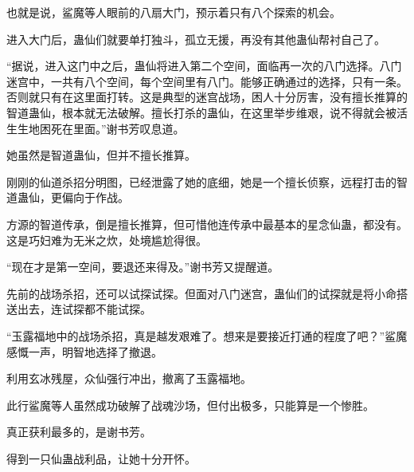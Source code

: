\begin{this_body}
也就是说，鲨魔等人眼前的八扇大门，预示着只有八个探索的机会。

进入大门后，蛊仙们就要单打独斗，孤立无援，再没有其他蛊仙帮衬自己了。

“据说，进入这门中之后，蛊仙将进入第二个空间，面临再一次的八门选择。八门迷宫中，一共有八个空间，每个空间里有八门。能够正确通过的选择，只有一条。否则就只有在这里面打转。这是典型的迷宫战场，困人十分厉害，没有擅长推算的智道蛊仙，根本就无法破解。擅长打杀的蛊仙，在这里举步维艰，说不得就会被活生生地困死在里面。”谢书芳叹息道。

她虽然是智道蛊仙，但并不擅长推算。

刚刚的仙道杀招分明图，已经泄露了她的底细，她是一个擅长侦察，远程打击的智道蛊仙，更偏向于作战。

方源的智道传承，倒是擅长推算，但可惜他连传承中最基本的星念仙蛊，都没有。这是巧妇难为无米之炊，处境尴尬得很。

“现在才是第一空间，要退还来得及。”谢书芳又提醒道。

先前的战场杀招，还可以试探试探。但面对八门迷宫，蛊仙们的试探就是将小命搭送出去，连试探都不能试探。

“玉露福地中的战场杀招，真是越发艰难了。想来是要接近打通的程度了吧？”鲨魔感慨一声，明智地选择了撤退。

利用玄冰残屋，众仙强行冲出，撤离了玉露福地。

此行鲨魔等人虽然成功破解了战魂沙场，但付出极多，只能算是一个惨胜。

真正获利最多的，是谢书芳。

得到一只仙蛊战利品，让她十分开怀。

\end{this_body}

